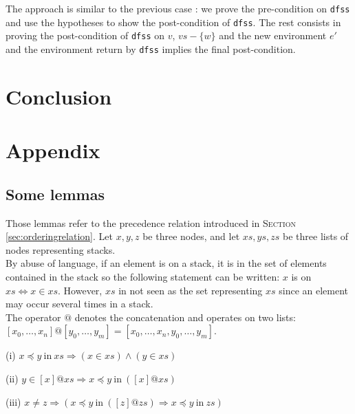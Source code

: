 \documentclass[a4 paper, 12pt]{article}
\begin{document}
{The approach is similar to the previous case : we prove the pre-condition on \texttt{dfss} and use the hypotheses to show the post-condition of \texttt{dfss}. The rest consists in proving the post-condition of \texttt{dfss} on $v$, $vs - \{w\}$ and the new environment $e'$ and the environment return by \texttt{dfss} implies the final post-condition.

\section{Conclusion}


\pagebreak

\section{Appendix}\label{appendix}
\subsection{Some lemmas}
Those lemmas refer to the precedence relation introduced in \textsc{Section} \ref{sec:orderingrelation}.
\BlankLine
Let $x, y, z$ be three nodes, and let $xs, ys, zs$ be three lists of nodes representing stacks.\\
By abuse of language, if an element is on a stack, it is in the set of elements contained in the stack so the following statement can be written: $x$ is on $xs \Longleftrightarrow x \in xs$. However, $xs$ in not seen as the set representing $xs$ since an element may occur several times in a stack.\\
The operator $@$ denotes the concatenation and operates on two lists: $[x_0, \dots, x_n] @ [y_0, \dots, y_m] = [x_0, \dots, x_n, y_0, \dots, y_m]$.\\

\begin{flushleft}
    (i)
$x \preceq y~\text{in}~xs \Longrightarrow (x \in xs)\wedge(y \in xs)$
\end{flushleft}
\begin{flushleft}
    (ii)
$y \in [x] @ xs \Longrightarrow x \preceq y~\text{in}~([x] @ xs)$
\end{flushleft}

\begin{flushleft}
    (iii)
    $x \neq z \Longrightarrow (x \preceq y~\text{in}~([z] @ zs) \Longrightarrow x \preceq y ~\text{in}~zs)$
\end{flushleft}

}
\end{document}
